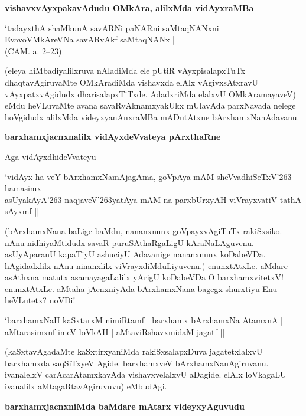 {\bigskip
\noindent
{\large\bf vishavxvAyxpakavAdudu OMkAra, alilxMda vidAyxraMBa}}
\medskip

\begin{shloka}
`tadayxthA shaMkunA savARNi paNARni saMtaqNANxni\\\label{84}
EvavoVMkAreVNa savARvAkf saMtaqNANx |\\
\hfill{(CAM. a. 2--23)}
\end{shloka}

\noindent
(eleya hiMbadiyalilxruva nAladiMda ele pUtiR vAyxpisalapxTuTx dhaqtavAgiru\-vaMte OMkAradiMda vishavxda elAlx vAgivxsAtxravU vAyxpatxvAgidudx dharisalapxTiTxde. AdadxriMda elalxvU OMkAramayaveV) eMdu heVLu\-vaMte avana savaRvAknamxyakUkx mUlavAda parxNavada nelege hoVgidudx alilxMda videyxyanAnxraMBa mADu\-tAtxne bArxhamxNanAdavanu.

{\bigskip
\noindent
{\large\bf barxhamxjacnxnalilx vidAyxdeVvateya pArxthaRne}}\label{page85}
\medskip

Aga vidAyxdhideVvateyu -

\begin{shloka}
`vidAyx ha veY bArxhamxNamAjagAma, goVpAya mAM sheVvadhiSeTxV\char'263 hamasimx |\\\label{85}
asUyakAyA\char'263 naqjaveV\char'263yatAya mAM na parxbUrxyAH viVrayxvatiV tathA sAyxmf ||
\end{shloka}

\noindent
(bArxhamxNana baLige baMdu, nananxnunx goVpayxvAgiTuTx rakiSxsiko. nAnu nidhiyaMtidudx savaR puruSAthaR\-gaLigU kAraNaLAguvenu. asUyAparanU kapaTiyU ashuciyU Adavanige nananxnunx koDabeVDa. hAgidadxlilx nAnu ninanxlilx viVrayxdiMduLiyuvenu.) enunxtAtxLe. aMdare asAthxna matutx asamayagaLalilx yArigU koDabeVDa O barxhamxvitetxV! enunxtAtxLe. aMtaha jAcnxniyAda bArxhamxNana bagegx shurxtiyu Enu heVLutetx? noVDi!

\begin{shloka}
`barxhamxNaH kaSxtarxM nimiRtamf | barxhamx bArxhamxNa AtamxnA |\\\label{85}
aMtarasimxnf imeV loVkAH | aMtaviRshavxmidaM jagatf ||
\end{shloka}

\noindent
(kaSxtavAgadaMte kaSxtirxyaniMda rakiSxsalapxDuva jagatetxlalxvU barxhamxda saqSiTxyeV Agide. barxhamxveV bArxhamxNa\-nAgi\-ru\-vanu. ivanalelxV carAcarAtamxkavAda vishavxvelalxvU aDagide. elAlx loVkagaLU ivanalilx aMtagaRta\-vAgiru\-vuvu) eMbudAgi. 

{\bigskip
\noindent
{\large\bf barxhamxjacnxniMda baMdare mAtarx videyxyAguvudu}}\label{page85}
\medskip

